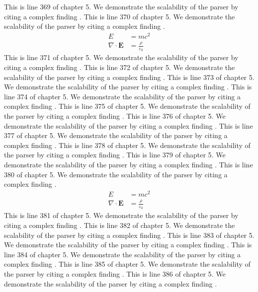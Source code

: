 This is line 369 of chapter 5. We demonstrate the scalability of the parser by citing a complex finding \cite{ref5_369}.
This is line 370 of chapter 5. We demonstrate the scalability of the parser by citing a complex finding \cite{ref5_370}.
\begin{align*}
  E &= mc^2 \\
  \nabla \cdot \mathbf{E} &= \frac{\rho}{\varepsilon_0}
\end{align*}
This is line 371 of chapter 5. We demonstrate the scalability of the parser by citing a complex finding \cite{ref5_371}.
This is line 372 of chapter 5. We demonstrate the scalability of the parser by citing a complex finding \cite{ref5_372}.
This is line 373 of chapter 5. We demonstrate the scalability of the parser by citing a complex finding \cite{ref5_373}.
This is line 374 of chapter 5. We demonstrate the scalability of the parser by citing a complex finding \cite{ref5_374}.
This is line 375 of chapter 5. We demonstrate the scalability of the parser by citing a complex finding \cite{ref5_375}.
This is line 376 of chapter 5. We demonstrate the scalability of the parser by citing a complex finding \cite{ref5_376}.
This is line 377 of chapter 5. We demonstrate the scalability of the parser by citing a complex finding \cite{ref5_377}.
This is line 378 of chapter 5. We demonstrate the scalability of the parser by citing a complex finding \cite{ref5_378}.
This is line 379 of chapter 5. We demonstrate the scalability of the parser by citing a complex finding \cite{ref5_379}.
This is line 380 of chapter 5. We demonstrate the scalability of the parser by citing a complex finding \cite{ref5_380}.
\begin{align*}
  E &= mc^2 \\
  \nabla \cdot \mathbf{E} &= \frac{\rho}{\varepsilon_0}
\end{align*}
This is line 381 of chapter 5. We demonstrate the scalability of the parser by citing a complex finding \cite{ref5_381}.
This is line 382 of chapter 5. We demonstrate the scalability of the parser by citing a complex finding \cite{ref5_382}.
This is line 383 of chapter 5. We demonstrate the scalability of the parser by citing a complex finding \cite{ref5_383}.
This is line 384 of chapter 5. We demonstrate the scalability of the parser by citing a complex finding \cite{ref5_384}.
This is line 385 of chapter 5. We demonstrate the scalability of the parser by citing a complex finding \cite{ref5_385}.
This is line 386 of chapter 5. We demonstrate the scalability of the parser by citing a complex finding \cite{ref5_386}.
